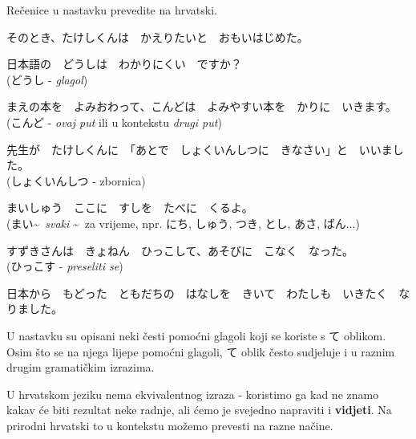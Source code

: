 	\begin{reibun}
	\end{reibun}

	
	\begin{mondai}{Rečenice u nastavku prevedite na hrvatski.}
		\item そのとき、たけしくんは　かえりたいと　おもいはじめた。
		\item 日本語の　どうしは　わかりにくい　ですか？\\(どうし - \textit{glagol})
		\item まえの本を　よみおわって、こんどは　よみやすい本を　かりに　いきます。\\(こんど - \textit{ovaj put} ili u kontekstu \textit{drugi put})
		\item 先生が　たけしくんに　「あとで　しょくいんしつに　きなさい」と　いいました。\\(しょくいんしつ - zbornica)
		\item まいしゅう　ここに　すしを　たべに　くるよ。\\(まい\textasciitilde~\textit{svaki} \textasciitilde~za vrijeme, npr. にち, しゅう, つき, とし, あさ, ばん...)
		\item すずきさんは　きょねん　ひっこして、あそびに　こなく　なった。\\(ひっこす - \textit{preseliti se})
		\item *日本から　もどった　ともだちの　はなしを　きいて　わたしも　いきたく　なりました。
	\end{mondai}
\newpage
{}

	
	U nastavku su opisani neki česti pomoćni glagoli koji se koriste s て oblikom. Osim što se na njega lijepe pomoćni glagoli, て oblik često sudjeluje i u raznim drugim gramatičkim izrazima.
	
	
	U hrvatskom jeziku nema ekvivalentnog izraza - koristimo ga kad ne znamo kakav će biti rezultat neke radnje, ali ćemo je svejedno napraviti i \textbf{vidjeti}. Na prirodni hrvatski to u kontekstu možemo prevesti na razne načine.
	

